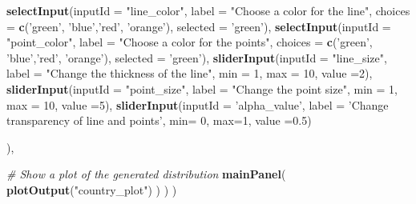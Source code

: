 \documentclass[
]{book}
\newenvironment{Shaded}{\begin{snugshade}}{\end{snugshade}}
\newcommand{\CommentTok}[1]{\textcolor[rgb]{0.56,0.35,0.01}{\textit{#1}}}
\newcommand{\DataTypeTok}[1]{\textcolor[rgb]{0.13,0.29,0.53}{#1}}
\newcommand{\DecValTok}[1]{\textcolor[rgb]{0.00,0.00,0.81}{#1}}
\newcommand{\FloatTok}[1]{\textcolor[rgb]{0.00,0.00,0.81}{#1}}
\newcommand{\KeywordTok}[1]{\textcolor[rgb]{0.13,0.29,0.53}{\textbf{#1}}}
\newcommand{\NormalTok}[1]{#1}
\newcommand{\StringTok}[1]{\textcolor[rgb]{0.31,0.60,0.02}{#1}}
\begin{document}
\begin{Shaded}
\begin{Highlighting}[]
            \KeywordTok{selectInput}\NormalTok{(}\DataTypeTok{inputId =} \StringTok{"line_color"}\NormalTok{,}
                        \DataTypeTok{label =} \StringTok{"Choose a color for the line"}\NormalTok{,}
                        \DataTypeTok{choices =} \KeywordTok{c}\NormalTok{(}\StringTok{'green'}\NormalTok{, }\StringTok{'blue'}\NormalTok{,}\StringTok{'red'}\NormalTok{, }\StringTok{'orange'}\NormalTok{),}
                        \DataTypeTok{selected =} \StringTok{'green'}\NormalTok{),}
            \KeywordTok{selectInput}\NormalTok{(}\DataTypeTok{inputId =} \StringTok{"point_color"}\NormalTok{,}
                        \DataTypeTok{label =} \StringTok{"Choose a color for the points"}\NormalTok{,}
                        \DataTypeTok{choices =} \KeywordTok{c}\NormalTok{(}\StringTok{'green'}\NormalTok{, }\StringTok{'blue'}\NormalTok{,}\StringTok{'red'}\NormalTok{, }\StringTok{'orange'}\NormalTok{),}
                        \DataTypeTok{selected =} \StringTok{'green'}\NormalTok{),}
            \KeywordTok{sliderInput}\NormalTok{(}\DataTypeTok{inputId =} \StringTok{"line_size"}\NormalTok{,}
                        \DataTypeTok{label =} \StringTok{"Change the thickness of the line"}\NormalTok{,}
                        \DataTypeTok{min =} \DecValTok{1}\NormalTok{,}
                        \DataTypeTok{max =} \DecValTok{10}\NormalTok{,}
                        \DataTypeTok{value =}\DecValTok{2}\NormalTok{),}
            \KeywordTok{sliderInput}\NormalTok{(}\DataTypeTok{inputId =} \StringTok{"point_size"}\NormalTok{,}
                        \DataTypeTok{label =} \StringTok{"Change the point size"}\NormalTok{,}
                        \DataTypeTok{min =} \DecValTok{1}\NormalTok{,}
                        \DataTypeTok{max =} \DecValTok{10}\NormalTok{,}
                        \DataTypeTok{value =}\DecValTok{5}\NormalTok{),}
            \KeywordTok{sliderInput}\NormalTok{(}\DataTypeTok{inputId =} \StringTok{'alpha_value'}\NormalTok{,}
                        \DataTypeTok{label =} \StringTok{'Change transparency of line and points'}\NormalTok{,}
                        \DataTypeTok{min=} \DecValTok{0}\NormalTok{,}
                        \DataTypeTok{max=}\DecValTok{1}\NormalTok{,}
                        \DataTypeTok{value =}\FloatTok{0.5}\NormalTok{)}

\NormalTok{        ),}

        \CommentTok{# Show a plot of the generated distribution}
        \KeywordTok{mainPanel}\NormalTok{(}
           \KeywordTok{plotOutput}\NormalTok{(}\StringTok{"country_plot"}\NormalTok{)}
\NormalTok{        )}
\NormalTok{    )}
\NormalTok{)}


\end{Highlighting}
\end{Shaded}
\end{document}
